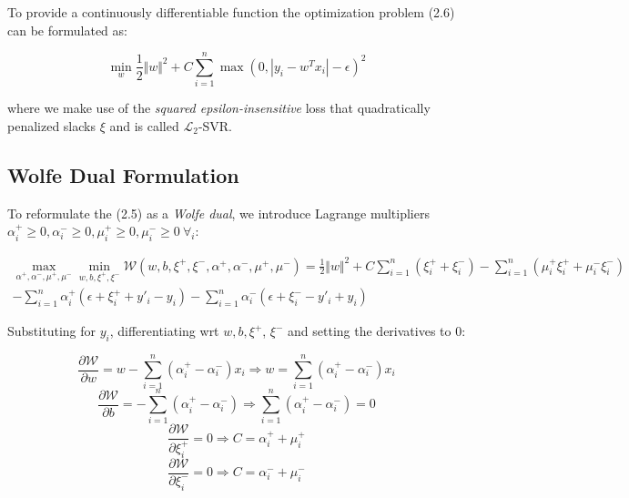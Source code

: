 To provide a continuously differentiable function the optimization problem (2.6) can be formulated as: 

\begin{equation}
    \min_ {w} \frac{1}{2} \Vert w\Vert^{2} + C \sum_{i=1}^n \max(0, |y_i - w^T x_i| - \epsilon)^2 \tag{2.7}
\end{equation}

where we make use of the \emph{squared epsilon-insensitive} loss that quadratically penalized slacks $\xi$ and is called $\mathcal{L}_2$-SVR.

\subsection{Wolfe Dual Formulation}

To reformulate the (2.5) as a \emph{Wolfe dual}, we introduce Lagrange multipliers $\alpha_i^+ \geq 0, \alpha_i^- \geq 0, \mu_i^+ \geq 0, \mu_i^- \geq 0 \ \forall_i$:

\begin{align*}
    \max_{\alpha^+,\alpha^-,\mu^+,\mu^-} \min_{w,b,\xi^+,\xi^-} \mathcal{W}(w,b,\xi^+,\xi^-,\alpha^+,\alpha^-,\mu^+,\mu^-) \displaystyle = \frac{1}{2}\Vert w\Vert^{2}+C \sum_{i=1}^n(\xi_i^+ + \xi_i^-)-\sum_{i=1}^n(\mu_i^+ \xi_i^+ + \mu_i^- \xi_i^-) \\ -\sum_{i=1}^n\alpha_i^+(\epsilon+\xi_i^+ + y'_i-y_i)-\sum_{i=1}^n\alpha_i^-(\epsilon+\xi_i^- - y'_i+y_i) \tag{2.8}
\end{align*}

Substituting for $y_i$, differentiating wrt $w, b, \xi^+$, $\xi^-$ and setting the derivatives to $0$:

\begin{equation}
    \displaystyle \frac{\partial \mathcal{W}}{\partial w}=w-\sum_{i=1}^{n}(\alpha_i^+ - \alpha_i^-) x_i \Rightarrow w=\sum_{i=1}^{n}(\alpha_i^+ - \alpha_i^-) x_i \tag{2.9}
\end{equation}
\begin{equation}
    \displaystyle \frac{\partial \mathcal{W}}{\partial b}=-\sum_{i=1}^{n}(\alpha_i^+ - \alpha_i^-)\Rightarrow \sum_{i=1}^{n}(\alpha_i^+ - \alpha_i^-)=0 \tag{2.10}
\end{equation}
\begin{equation}
    \displaystyle \frac{\partial \mathcal{W}}{\partial\xi_i^+}=0\Rightarrow C=\alpha_i^+ + \mu_i^+ \tag{2.11}
\end{equation}
\begin{equation}
    \displaystyle \frac{\partial \mathcal{W}}{\partial\xi_i^-}=0\Rightarrow C=\alpha_i^- + \mu_i^- \tag{2.12}
\end{equation}

